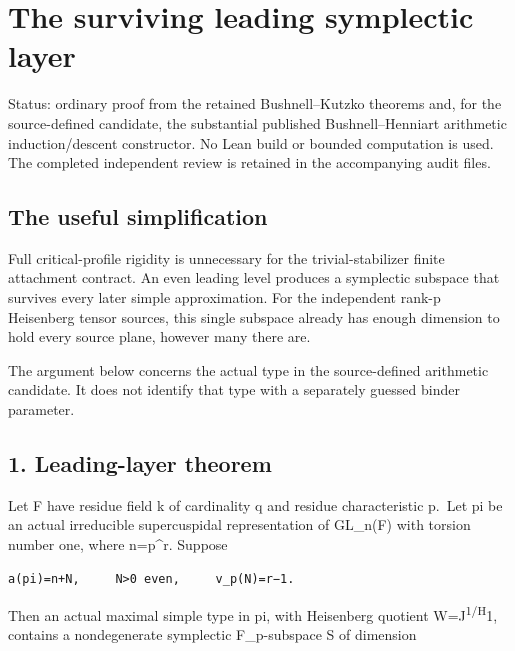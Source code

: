 \clearpage
\section{The surviving leading symplectic layer}\label{app:odd_capacity}

Status: ordinary proof from the retained Bushnell--Kutzko theorems and,
for the source-defined candidate, the substantial published
Bushnell--Henniart arithmetic induction/descent constructor. No Lean
build or bounded computation is used. The completed independent review
is retained in the accompanying audit files.

\hypertarget{odd_capacity-the-useful-simplification}{%
\subsection{The useful simplification}\label{odd_capacity-the-useful-simplification}}

Full critical-profile rigidity is unnecessary for the trivial-stabilizer
finite attachment contract. An even leading level produces a symplectic
subspace that survives every later simple approximation. For the
independent rank-p Heisenberg tensor sources, this single subspace
already has enough dimension to hold every source plane, however many
there are.

The argument below concerns the actual type in the source-defined
arithmetic candidate. It does not identify that type with a separately
guessed binder parameter.

\hypertarget{odd_capacity-leading-layer-theorem}{%
\subsection{1. Leading-layer theorem}\label{odd_capacity-leading-layer-theorem}}

Let F have residue field k of cardinality q and residue characteristic
p.~Let pi be an actual irreducible supercuspidal representation of
GL\_n(F) with torsion number one, where n=p\^{}r. Suppose

\begin{Verbatim}[fontsize=\small,breaklines=true,breakanywhere=true]
a(pi)=n+N,     N>0 even,     v_p(N)=r−1.
\end{Verbatim}

Then an actual maximal simple type in pi, with Heisenberg quotient
W=J\textsuperscript{1/H}1, contains a nondegenerate symplectic
F\_p-subspace S of dimension


